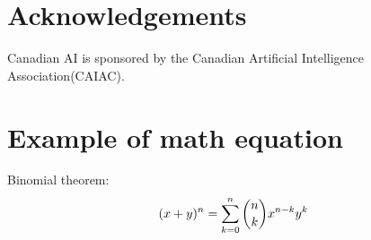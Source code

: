\documentclass[10pt]{cai}
\begin{document}
\section*{Acknowledgements}
Canadian AI is sponsored by the Canadian Artificial Intelligence Association(CAIAC)\cite{caiac}.

\appendix

\section{Example of math equation }
Binomial theorem: \cite{abramowitz1948handbook}
\begin{equation}
(x+y)^n=\sum_{\substack{k=0}}^{n}\dbinom{n}{k}x^{n-k}y^k
\end{equation}





\printbibliography[heading=subbibintoc]
\end{document}
